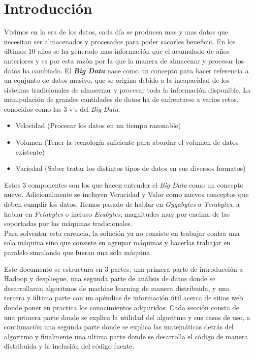 \chapter*{Introducción}%

Vivimos en la era de los datos, cada día se producen mas y mas datos que
necesitan ser almacenados y procesados para poder sacarles beneficio.
En los últimos 10 años se ha generado mas información que el acumulado de años
anteriores y es por esta razón  por la que la manera de almacenar y procesar
los datos ha cambiado.
El \textbf{\textit{Big Data}}\label{big_data_def} nace como un concepto para hacer referencia a un 
conjunto de datos masivo, que se origina debido a la incapacidad de los sistemas tradicionales 
de almacenar y procesar toda la información disponible.
La manipulación de grandes cantidades de datos ha de enfrentarse a varios
retos, conocidos como las 3 v's del \textit{Big Data}.
\begin{itemize}
  \item Velocidad (Procesar los datos en un tiempo razonable)
  \item Volumen (Tener la tecnología suficiente para abordar el volumen de datos existente)
  \item Variedad (Saber tratar los distintos tipos de datos en sus diversos formatos)
\end{itemize}
Estos 3 componentes son los que hacen entender el \textit{Big Data} como un 
concepto nuevo. Adicionalmente se incluyen Veracidad y Valor como nuevos conceptos que deben cumplir los datos.
Hemos pasado de hablar en \textit{Gygabytes} o \textit{Terabytes}, a hablar 
en \textit{Petabytes} o incluso \textit{Exabytes}, magnitudes muy por encima de las soportadas 
por las máquinas tradicionales.\\
Para solventar esta carencia, la solución ya no consiste en trabajar contra una sola máquina
sino que consiste en agrupar máquinas y hacerlas trabajar en paralelo simulando que fueran una sola máquina.

Este documento se estructura en 3 partes, una primera parte de introducción a Hadoop y despliegue,
una segunda parte de análisis de datos donde se desarrollaran algoritmos de machine learning de manera distribuida, y una tercera y última parte con un apéndice de información útil acerca de sitios web 
donde poner en practica los conocimientos adquiridos.
Cada sección consta de una primera parte donde se explica la utilidad del algoritmo y sus casos de
uso, a continuación una segunda parte donde se explica las matemáticas detrás del algoritmo y 
finalmente una ultima parte donde se desarrolla el código de manera distribuida y la inclusión 
del código fuente.
\newline

